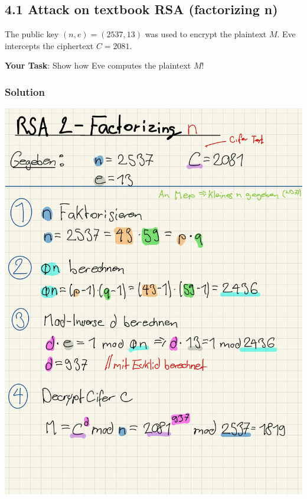 \documentclass[11pt]{article}
\begin{document}
\newpage

    \hypertarget{attack-on-textbook-rsa-factorizing-n}{%
\subsection{4.1 Attack on textbook RSA (factorizing
n)}\label{attack-on-textbook-rsa-factorizing-n}}

The public key \((n,e) = (2537,13)\) was used to encrypt the plaintext
\(M\). Eve intercepts the ciphertext \(C = 2081\).

\textbf{Your Task}: Show how Eve computes the plaintext \(M\)!

\hypertarget{solution}{%
\subsubsection{Solution}\label{solution}}

\begin{center}
	\includegraphics[scale=0.8]{img/rsa_2_factorizing.jpg}
\end{center}
\end{document}
